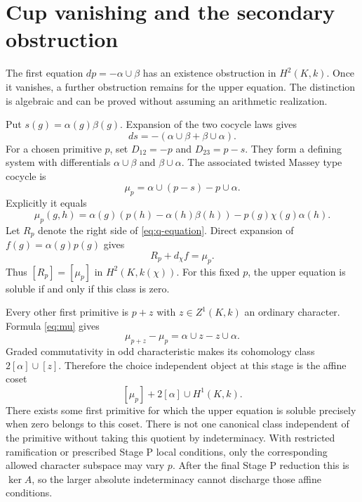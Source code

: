 \section{Cup vanishing and the secondary obstruction}\label{sec:secondary}
The first equation $dp=-\alpha\cup\beta$ has an existence obstruction in $H^2(K,k)$. Once it vanishes, a further obstruction remains for the upper equation. The distinction is algebraic and can be proved without assuming an arithmetic realization.

Put $s(g)=\alpha(g)\beta(g)$. Expansion of the two cocycle laws gives
\begin{equation}\label{eq:ds}
ds=-(\alpha\cup\beta+\beta\cup\alpha).
\end{equation}
For a chosen primitive $p$, set $D_{12}=-p$ and $D_{23}=p-s$. They form a defining system with differentials $\alpha\cup\beta$ and $\beta\cup\alpha$. The associated twisted Massey type cocycle is
\begin{equation}\label{eq:mu}
\mu_p=\alpha\cup(p-s)-p\cup\alpha.
\end{equation}
Explicitly it equals
\[
\mu_p(g,h)=\alpha(g)(p(h)-\alpha(h)\beta(h))
-p(g)\chi(g)\alpha(h).
\]
Let $R_p$ denote the right side of \eqref{eq:q-equation}. Direct expansion of $f(g)=\alpha(g)p(g)$ gives
\begin{equation}\label{eq:secondaryidentity}
R_p+d_\chi f=\mu_p.
\end{equation}
Thus $[R_p]=[\mu_p]$ in $H^2(K,k(\chi))$. For this fixed $p$, the upper equation is soluble if and only if this class is zero.

Every other first primitive is $p+z$ with $z\in Z^1(K,k)$ an ordinary character. Formula \eqref{eq:mu} gives
\[
\mu_{p+z}-\mu_p=\alpha\cup z-z\cup\alpha.
\]
Graded commutativity in odd characteristic makes its cohomology class $2[\alpha]\cup[z]$. Therefore the choice independent object at this stage is the affine coset
\begin{equation}\label{eq:masseycoset}
[\mu_p]+2[\alpha]\cup H^1(K,k).
\end{equation}
There exists some first primitive for which the upper equation is soluble precisely when zero belongs to this coset. There is not one canonical class independent of the primitive without taking this quotient by indeterminacy. With restricted ramification or prescribed Stage P local conditions, only the corresponding allowed character subspace may vary $p$. After the final Stage P reduction this is $\ker A$, so the larger absolute indeterminacy cannot discharge those affine conditions.


